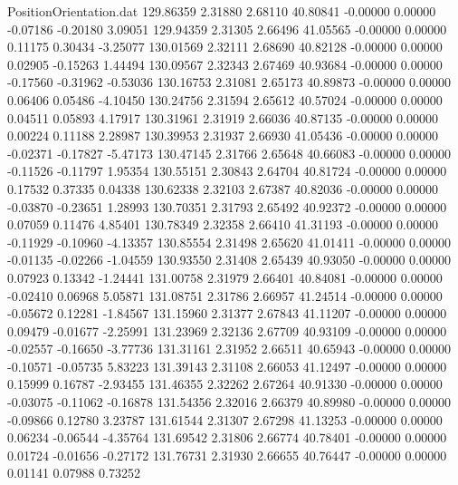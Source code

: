 \begin{filecontents}{PositionOrientation.dat}
 129.86359    2.31880    2.68110    40.80841   -0.00000    0.00000   -0.07186   -0.20180    3.09051
 129.94359    2.31305    2.66496    41.05565   -0.00000    0.00000    0.11175    0.30434   -3.25077
 130.01569    2.32111    2.68690    40.82128   -0.00000    0.00000    0.02905   -0.15263    1.44494
 130.09567    2.32343    2.67469    40.93684   -0.00000    0.00000   -0.17560   -0.31962   -0.53036
 130.16753    2.31081    2.65173    40.89873   -0.00000    0.00000    0.06406    0.05486   -4.10450
 130.24756    2.31594    2.65612    40.57024   -0.00000    0.00000    0.04511    0.05893    4.17917
 130.31961    2.31919    2.66036    40.87135   -0.00000    0.00000    0.00224    0.11188    2.28987
 130.39953    2.31937    2.66930    41.05436   -0.00000    0.00000   -0.02371   -0.17827   -5.47173
 130.47145    2.31766    2.65648    40.66083   -0.00000    0.00000   -0.11526   -0.11797    1.95354
 130.55151    2.30843    2.64704    40.81724   -0.00000    0.00000    0.17532    0.37335    0.04338
 130.62338    2.32103    2.67387    40.82036   -0.00000    0.00000   -0.03870   -0.23651    1.28993
 130.70351    2.31793    2.65492    40.92372   -0.00000    0.00000    0.07059    0.11476    4.85401
 130.78349    2.32358    2.66410    41.31193   -0.00000    0.00000   -0.11929   -0.10960   -4.13357
 130.85554    2.31498    2.65620    41.01411   -0.00000    0.00000   -0.01135   -0.02266   -1.04559
 130.93550    2.31408    2.65439    40.93050   -0.00000    0.00000    0.07923    0.13342   -1.24441
 131.00758    2.31979    2.66401    40.84081   -0.00000    0.00000   -0.02410    0.06968    5.05871
 131.08751    2.31786    2.66957    41.24514   -0.00000    0.00000   -0.05672    0.12281   -1.84567
 131.15960    2.31377    2.67843    41.11207   -0.00000    0.00000    0.09479   -0.01677   -2.25991
 131.23969    2.32136    2.67709    40.93109   -0.00000    0.00000   -0.02557   -0.16650   -3.77736
 131.31161    2.31952    2.66511    40.65943   -0.00000    0.00000   -0.10571   -0.05735    5.83223
 131.39143    2.31108    2.66053    41.12497   -0.00000    0.00000    0.15999    0.16787   -2.93455
 131.46355    2.32262    2.67264    40.91330   -0.00000    0.00000   -0.03075   -0.11062   -0.16878
 131.54356    2.32016    2.66379    40.89980   -0.00000    0.00000   -0.09866    0.12780    3.23787
 131.61544    2.31307    2.67298    41.13253   -0.00000    0.00000    0.06234   -0.06544   -4.35764
 131.69542    2.31806    2.66774    40.78401   -0.00000    0.00000    0.01724   -0.01656   -0.27172
 131.76731    2.31930    2.66655    40.76447   -0.00000    0.00000    0.01141    0.07988    0.73252

\end{filecontents}
